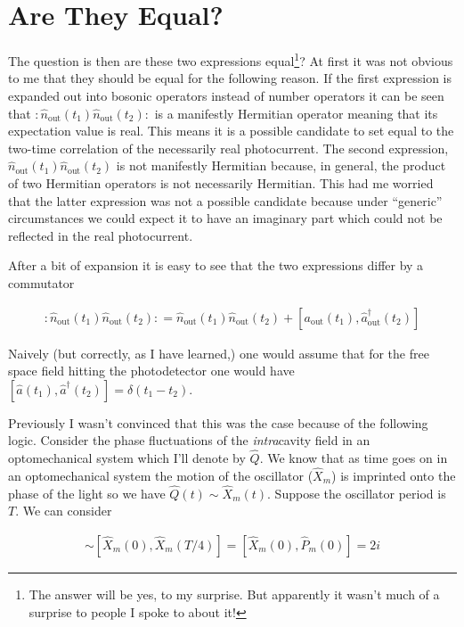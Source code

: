 \documentclass[12pt]{article}
\begin{document}
\section{Are They Equal?}
The question is then are these two expressions equal\footnote{The answer will be yes, to my surprise. But apparently it wasn't much of a surprise to people I spoke to about it!}? At first it was not obvious to me that they should be equal for the following reason. If the first expression is expanded out into bosonic operators instead of number operators it can be seen that $:\hat{n}_{\text{out}}(t_1)\hat{n}_{\text{out}}(t_2):$ is a manifestly Hermitian operator meaning that its expectation value is real. This means it is a possible candidate to set equal to the two-time correlation of the necessarily real photocurrent. The second expression, $\hat{n}_{\text{out}}(t_1)\hat{n}_{\text{out}}(t_2)$ is not manifestly Hermitian because, in general, the product of two Hermitian operators is not necessarily Hermitian. This had me worried that the latter expression was not a possible candidate because under ``generic'' circumstances we could expect it to have an imaginary part which could not be reflected in the real photocurrent.

After a bit of expansion it is easy to see that the two expressions differ by a commutator

\begin{align}
:\hat{n}_{\text{out}}(t_1)\hat{n}_{\text{out}}(t_2): = \hat{n}_{\text{out}}(t_1)\hat{n}_{\text{out}}(t_2) + [a_{\text{out}}(t_1),\hat{a}^{\dag}_{\text{out}}(t_2)]
\end{align}

Naively (but correctly, as I have learned,) one would assume that for the free space field hitting the photodetector one would have $[\hat{a}(t_1),\hat{a}^{\dag}(t_2)] = \delta(t_1-t_2)$.

Previously I wasn't convinced that this was the case because of the following logic. Consider the phase fluctuations of the \textit{intra}cavity field in an optomechanical system which I'll denote by $\hat{Q}$. We know that as time goes on in an optomechanical system the motion of the oscillator ($\hat{X}_m$) is imprinted onto the phase of the light so we have $\hat{Q}(t) \sim \hat{X}_m(t)$. Suppose the oscillator period is $T$. We can consider

\begin{align}
[\hat{Q}(0),\hat{Q}(T/4)] \sim [\hat{X}_m(0),\hat{X}_m(T/4)] = [\hat{X}_m(0),\hat{P}_m(0)] = 2i
\end{align}
\end{document}
